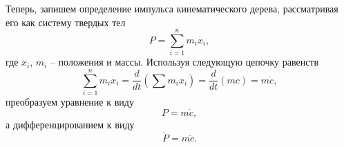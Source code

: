 Теперь, запишем определение импульса кинематического дерева, рассматривая его как систему твердых тел
\begin{equation*}
  P = \sum_{i = 1}^{n} m_{i} \dot{x_{i}},
\end{equation*}
где $x_{i}$, $m_{i}$ -- положения и массы. Используя следующую цепочку равенств
\begin{equation*}
  \sum_{i = 1}^{n} m_{i} \dot{x_{i}} = \frac{d}{dt} (\sum m_{i} x_{i}) = \frac{d}{dt} (mc) = m \dot{c},
\end{equation*}
преобразуем уравнение к виду
\begin{equation}
  P = m \dot{c}, \tag{1.10}\label{eq:1.10}
\end{equation}
а дифференцированием к виду
\begin{equation}
  \dot{P} = m \ddot{c}. \tag{1.11}\label{eq:1.11}
\end{equation}
